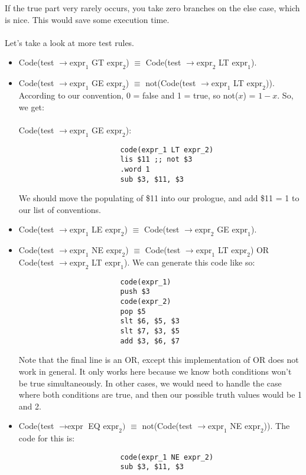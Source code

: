 \documentclass[]{article}
\theoremstyle{definition}
\begin{document}
				If the true part very rarely occurs, you take zero branches on the else case, which is nice. This would save some execution time.
				\\ \\
				Let's take a look at more test rules.
				\begin{itemize}
					\item Code(test $\to \text{expr}_1$ GT $\text{expr}_2$) $\equiv$ Code(test $\to \text{expr}_2$ LT $\text{expr}_1$).
					\item Code(test $\to \text{expr}_1$ GE $\text{expr}_2$) $\equiv$ not(Code(test $\to \text{expr}_1$ LT $\text{expr}_2$)). According to our convention, 0 = false and 1 = true, so not($x$) = $1 - x$. So, we get:
						\\ \\
						Code(test $\to \text{expr}_1$ GE $\text{expr}_2$):
						\begin{verbatim}
						code(expr_1 LT expr_2)
						lis $11 ;; not $3
						.word 1
						sub $3, $11, $3
						\end{verbatim}

						We should move the populating of \$11 into our prologue, and add \$11 = 1 to our list of conventions.

					\item Code(test $\to \text{expr}_1$ LE $\text{expr}_2$) $\equiv$ Code(test $\to \text{expr}_2$ GE $\text{expr}_1$).
					\item Code(test $\to \text{expr}_1$ NE $\text{expr}_2$) $\equiv$ Code(test $\to \text{expr}_1$ LT $\text{expr}_2$) OR Code(test $\to \text{expr}_2$ LT $\text{expr}_1$). We can generate this code like so:
						\begin{verbatim}
						code(expr_1)
						push $3
						code(expr_2)
						pop $5
						slt $6, $5, $3
						slt $7, $3, $5
						add $3, $6, $7
						\end{verbatim}

						Note that the final line is an OR, except this implementation of OR does not work in general. It only works here because we know both conditions won't be true simultaneously. In other cases, we would need to handle the case where both conditions are true, and then our possible truth values would be 1 and 2.
					\item Code(test $\to \text{expr}$ EQ $\text{expr}_2)$ $\equiv$ not(Code(test $\to \text{expr}_1$ NE $\text{expr}_2$)). The code for this is:
						\begin{verbatim}
						code(expr_1 NE expr_2)
						sub $3, $11, $3
						\end{verbatim}
				\end{itemize}
\end{document}
